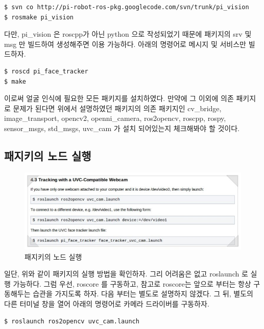 \vspace{\baselineskip}
\begin{lstlisting}[language=ROS]
$ svn co http://pi-robot-ros-pkg.googlecode.com/svn/trunk/pi_vision
$ rosmake pi_vision
\end{lstlisting}

다만, pi\_vision 은 roscpp가 아닌 python 으로 작성되었기 때문에 패키지의 srv 및 msg 만 빌드하여 생성해주면 이용 가능하다.  아래의 명령어로 메시지 및 서비스만 빌드하자.

\vspace{\baselineskip}
\begin{lstlisting}[language=ROS]
$ roscd pi_face_tracker
$ make
\end{lstlisting}

이로써 얼굴 인식에 필요한 모든 패키지를 설치하였다. 만약에 그 이외에 의존 패키지로 문제가 된다면 위에서 설명하였던 패키지의 의존 패키지인 cv\_bridge, image\_transport, opencv2, openni\_camera, ros2opencv, roscpp, rospy, sensor\_msgs, std\_msgs, uvc\_cam 가 설치 되어있는지 체크해봐야 할 것이다.

\subsection{패지키의 노드 실행}

\begin{figure}[h]
\centering\includegraphics[width=0.9\columnwidth]{pictures/chapter8/openpkg5.jpg}
\caption{패지키의 노드 실행}
\end{figure}

일단, 위와 같이 패키지의 실행 방법을 확인하자. 그리 어려움은 없고 roslaunch 로 실행 가능하다. 그럼 우선, roscore 를 구동하고, 참고로 roscore는 앞으로 부터는 항상 구동해두는 습관을 가지도록 하자. 다음 부터는 별도로 설명하지 않겠다. 그 뒤, 별도의 다른 터미널 창을 열어 아래의 명령어로 카메라 드라이버를 구동하자.

\vspace{\baselineskip}
\begin{lstlisting}[language=ROS]
$ roslaunch ros2opencv uvc_cam.launch
\end{lstlisting}

